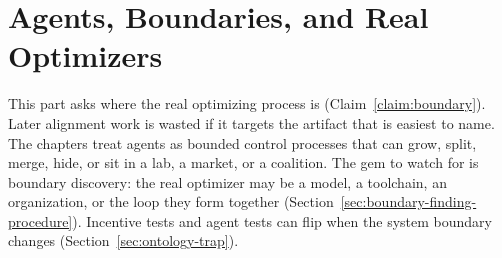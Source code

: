 \part{Agents, Boundaries, and Real Optimizers}

This part asks where the real optimizing process is (Claim~\ref{claim:boundary}).
Later alignment work is wasted if it targets the artifact that is easiest to name.
The chapters treat agents as bounded control processes that can grow, split, merge, hide, or sit in a lab, a market, or a coalition.
The gem to watch for is boundary discovery: the real optimizer may be a model, a toolchain, an organization, or the loop they form together (Section~\ref{sec:boundary-finding-procedure}).
Incentive tests and agent tests can flip when the system boundary changes (Section~\ref{sec:ontology-trap}).






